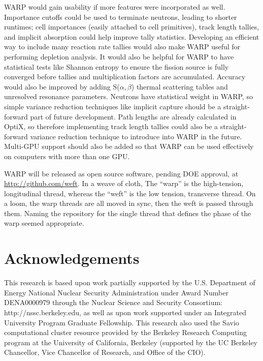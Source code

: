 \documentclass[preprint,12pt]{elsarticle}
\begin{document}
WARP would gain usability if more features were incorporated as well.  Importance cutoffs could be used to terminate neutrons, leading to shorter runtimes; cell importances (easily attached to cell primitives), track length tallies, and implicit absorption could help improve tally statistics.  Developing an efficient way to include many reaction rate tallies would also make WARP useful for performing depletion analysis.  It would also be helpful for WARP to have statistical tests like Shannon entropy to ensure the fission source is fully converged before tallies and multiplication factors are accumulated.  Accuracy would also be improved by adding S($\alpha,\beta$) thermal scattering tables and unresolved resonance parameters.  Neutrons have statistical weight in WARP, so simple variance reduction techniques like implicit capture should be a straight-forward part of future development.  Path lengths are already calculated in OptiX, so therefore implementing track length tallies could also be a straight-forward variance reduction technique to introduce into WARP in the future.  Multi-GPU support should also be added so that WARP can be used effectively on computers with more than one GPU.


WARP will be released as open source software, pending DOE approval, at \url{http://github.com/weft}.  In a weave of cloth, The ``warp'' is the high-tension, longitudinal thread, whereas the ``weft'' is the low tension, transverse thread.  On a loom, the warp threads are all moved in sync, then the weft is passed through them.  Naming the repository for the single thread that defines the phase of the warp seemed appropriate.

\section*{Acknowledgements}
\label{sec:ack}

This research is based upon work partially supported by the U.S. Department of Energy National Nuclear Security Administration under Award Number DENA0000979 through the Nuclear Science and Security Consortium: http://nssc.berkeley.edu, as well as upon work supported under an Integrated University Program Graduate Fellowship.  This research also used the Savio computational cluster resource provided by the Berkeley Research Computing program at the University of California, Berkeley (supported by the UC Berkeley Chancellor, Vice Chancellor of Research, and Office of the CIO).
\end{document}

